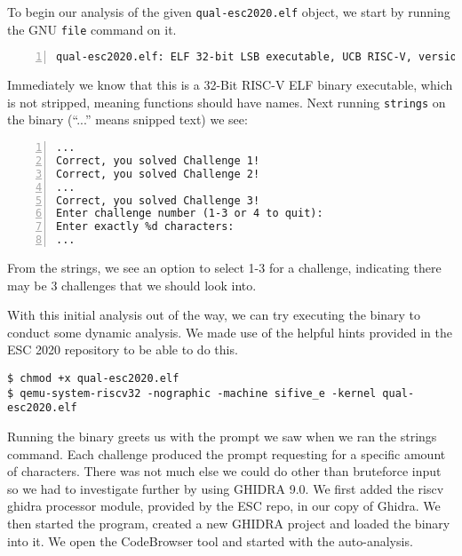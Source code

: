 To begin our analysis of the given \texttt{qual-esc2020.elf} object, we start by running the GNU \texttt{file} command on it.
\begin{lstlisting}[numbers=left,language=none]
    qual-esc2020.elf: ELF 32-bit LSB executable, UCB RISC-V, version 1 (SYSV), statically linked, not stripped
\end{lstlisting}
Immediately we know that this is a 32-Bit RISC-V ELF binary executable, which is not stripped, meaning functions should have names.
Next running \texttt{strings} on the binary (``...'' means snipped text) we see:
\begin{lstlisting}[numbers=left,language=none]
...
Correct, you solved Challenge 1!
Correct, you solved Challenge 2!
...
Correct, you solved Challenge 3!
Enter challenge number (1-3 or 4 to quit):
Enter exactly %d characters:
...
\end{lstlisting}
From the strings, we see an option to select 1-3 for a challenge, indicating there may be 3 challenges that we should look into.

With this initial analysis out of the way, we can try executing the binary to conduct some dynamic analysis. We made use of the helpful hints provided in the ESC 2020 repository to be able to do this.

\begin{lstlisting}[language=none]
$ chmod +x qual-esc2020.elf
$ qemu-system-riscv32 -nographic -machine sifive_e -kernel qual-esc2020.elf
\end{lstlisting}

Running the binary greets us with the prompt we saw when we ran the strings command. Each challenge produced the prompt requesting for a specific amount of characters. There was not much else we could do other than bruteforce input so we had to investigate further by using GHIDRA 9.0.
We first added the riscv ghidra processor module, provided by the ESC repo, in our copy of Ghidra. We then started the program, created a new GHIDRA project and loaded the binary into it. We open the CodeBrowser tool and started with the auto-analysis.
